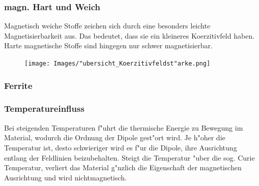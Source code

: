         \subsubsection*{magn. Hart und Weich}
            Magnetisch weiche Stoffe zeichen sich durch eine besonders leichte Magnetisierbarkeit aus. Das bedeutet,
            dass sie ein kleineres Koerzitivfeld haben. Harte
            magnetische Stoffe sind hingegen nur schwer magnetisierbar.
            \begin{figure}[H]
                \centering
                \texttt{[image: Images/"ubersicht\_Koerzitivfeldst"arke.png]}
            \end{figure}
        \subsubsection*{Ferrite}

        \subsubsection*{Temperatureinfluss}
            Bei steigenden Temperaturen f"uhrt die thermische Energie zu Bewegung im Material, wodurch die Ordnung der
            Dipole gest"ort wird. Je h"oher die Temperatur ist, desto schwieriger wird es f"ur die Dipole, ihre Ausrichtung entlang
            der Feldlinien beizubehalten. Steigt die Temperatur "uber die sog. Curie Temperatur, verliert das Material g"nzlich
            die Eigenschaft der magnetischen Ausrichtung und wird nichtmagnetisch.
